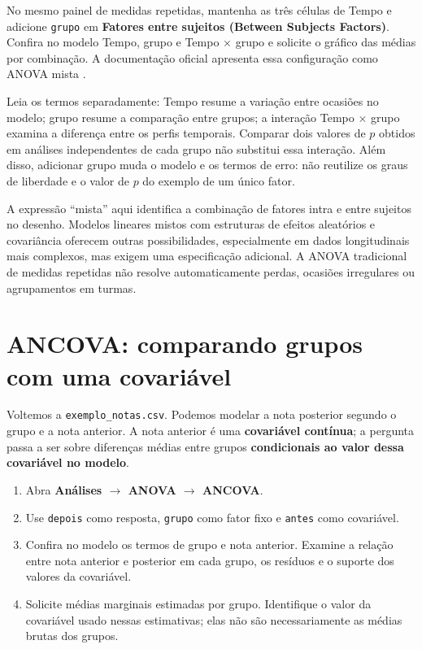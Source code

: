 No mesmo painel de medidas repetidas, mantenha as três células de Tempo e adicione \texttt{grupo} em \textbf{Fatores entre sujeitos (Between Subjects Factors)}. Confira no modelo Tempo, grupo e Tempo $\times$ grupo e solicite o gráfico das médias por combinação. A documentação oficial apresenta essa configuração como ANOVA mista \parencite{JamoviAnovaMista}.

Leia os termos separadamente: Tempo resume a variação entre ocasiões no modelo; grupo resume a comparação entre grupos; a interação Tempo $\times$ grupo examina a diferença entre os perfis temporais. Comparar dois valores de $p$ obtidos em análises independentes de cada grupo não substitui essa interação. Além disso, adicionar grupo muda o modelo e os termos de erro: não reutilize os graus de liberdade e o valor de $p$ do exemplo de um único fator.

A expressão ``mista'' aqui identifica a combinação de fatores intra e entre sujeitos no desenho. Modelos lineares mistos com estruturas de efeitos aleatórios e covariância oferecem outras possibilidades, especialmente em dados longitudinais mais complexos, mas exigem uma especificação adicional. A ANOVA tradicional de medidas repetidas não resolve automaticamente perdas, ocasiões irregulares ou agrupamentos em turmas.

\section{ANCOVA: comparando grupos com uma covariável}

Voltemos a \texttt{exemplo\_notas.csv}. Podemos modelar a nota posterior segundo o grupo e a nota anterior. A nota anterior é uma \textbf{covariável contínua}; a pergunta passa a ser sobre diferenças médias entre grupos \textbf{condicionais ao valor dessa covariável no modelo}.

\begin{enumerate}
  \item Abra \textbf{Análises $\rightarrow$ ANOVA $\rightarrow$ ANCOVA}.
  \item Use \texttt{depois} como resposta, \texttt{grupo} como fator fixo e \texttt{antes} como covariável.
  \item Confira no modelo os termos de grupo e nota anterior. Examine a relação entre nota anterior e posterior em cada grupo, os resíduos e o suporte dos valores da covariável.
  \item Solicite médias marginais estimadas por grupo. Identifique o valor da covariável usado nessas estimativas; elas não são necessariamente as médias brutas dos grupos.
\end{enumerate}

